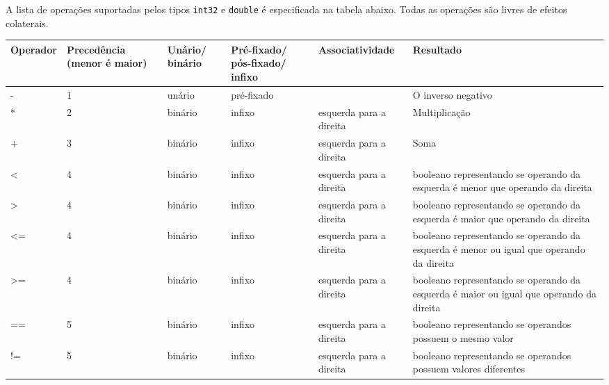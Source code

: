 \documentclass[12pt, a4paper]{article}
\begin{document}
A lista de operações suportadas pelos tipos \texttt{int32} e \texttt{double} é
especificada na tabela abaixo. Todas as operações são livres de efeitos
colaterais.

\begin{tabular}{| p{1.5cm} | p{2cm} | p{1.2cm} | p{1.2cm} | p{2.7cm} | p{5cm} | }
\hline
Operador      & Precedência (menor é maior) & Unário/ binário & Pré-fixado/ pós-fixado/ infixo & Associatividade         & Resultado                                                                               \\
\hline
\hline
-             & 1                           & unário         & pré-fixado                   &                         & O inverso negativo                                                                      \\
\hline
*             & 2                           & binário        & infixo                       & esquerda para a direita & Multiplicação                                                                           \\
\hline
+             & 3                           & binário        & infixo                       & esquerda para a direita & Soma                                                                                    \\
\hline
\textless     & 4                           & binário        & infixo                       & esquerda para a direita & booleano representando se operando da esquerda é menor que operando da direita          \\
\hline
\textgreater  & 4                           & binário        & infixo                       & esquerda para a direita & booleano representando se operando da esquerda é maior que operando da direita          \\
\hline
\textless=    & 4                           & binário        & infixo                       & esquerda para a direita & booleano representando se operando da esquerda é menor ou igual que operando da direita \\
\hline
\textgreater= & 4                           & binário        & infixo                       & esquerda para a direita & booleano representando se operando da esquerda é maior ou igual que operando da direita \\
\hline
==            & 5                           & binário        & infixo                       & esquerda para a direita & booleano representando se operandos possuem o mesmo valor                               \\
\hline
!=            & 5                           & binário        & infixo                       & esquerda para a direita & booleano representando se operandos possuem valores diferentes \\
\hline
\end{tabular}
\end{document}
